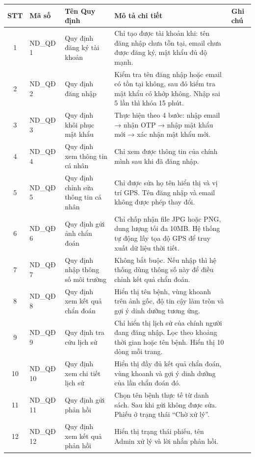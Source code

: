 \documentclass[12pt,a4paper]{article}
\begin{document}
\begin{longtable}{|c|p{1.8cm}|p{3.5cm}|p{6.5cm}|p{1cm}|}
\hline
\rowcolor{headerblue}
\textbf{STT} & \textbf{Mã số} & \textbf{Tên Quy định} & \textbf{Mô tả chi tiết} & \textbf{Ghi chú} \\
\hline
\endhead
1 & ND\_QĐ 1 & Quy định đăng ký tài khoản & Chỉ tạo được tài khoản khi: tên đăng nhập chưa tồn tại, email chưa được đăng ký, mật khẩu đủ độ mạnh. & \\
\hline
2 & ND\_QĐ 2 & Quy định đăng nhập & Kiểm tra tên đăng nhập hoặc email có tồn tại không, sau đó kiểm tra mật khẩu có khớp không. Nhập sai 5 lần thì khóa 15 phút. & \\
\hline
3 & ND\_QĐ 3 & Quy định khôi phục mật khẩu & Thực hiện theo 4 bước: nhập email → nhận OTP → nhập mật khẩu mới → xác nhận mật khẩu mới. & \\
\hline
4 & ND\_QĐ 4 & Quy định xem thông tin cá nhân & Chỉ xem được thông tin của chính mình sau khi đã đăng nhập. & \\
\hline
5 & ND\_QĐ 5 & Quy định chỉnh sửa thông tin cá nhân & Chỉ được sửa họ tên hiển thị và vị trí GPS. Tên đăng nhập và email không được phép thay đổi. & \\
\hline
6 & ND\_QĐ 6 & Quy định gửi ảnh chẩn đoán & Chỉ chấp nhận file JPG hoặc PNG, dung lượng tối đa 10MB. Hệ thống tự động lấy tọa độ GPS để truy xuất dữ liệu thời tiết. & \\
\hline
7 & ND\_QĐ 7 & Quy định nhập thông số môi trường & Không bắt buộc. Nếu nhập thì hệ thống dùng thông số này để điều chỉnh kết quả chẩn đoán. & \\
\hline
8 & ND\_QĐ 8 & Quy định xem kết quả chẩn đoán & Hiển thị tên bệnh, vùng khoanh trên ảnh gốc, độ tin cậy làm tròn và gợi ý dinh dưỡng tương ứng. & \\
\hline
9 & ND\_QĐ 9 & Quy định tra cứu lịch sử & Chỉ hiển thị lịch sử của chính người đang đăng nhập. Lọc theo khoảng thời gian hoặc tên bệnh. Hiển thị 10 dòng mỗi trang. & \\
\hline
10 & ND\_QĐ 10 & Quy định xem chi tiết lịch sử & Hiển thị đầy đủ kết quả chẩn đoán, vùng khoanh và gợi ý dinh dưỡng của lần chẩn đoán đó. & \\
\hline
11 & ND\_QĐ 11 & Quy định gửi phản hồi & Chọn tên bệnh thực tế từ danh sách. Sau khi gửi không được sửa. Phiếu ở trạng thái ``Chờ xử lý''. & \\
\hline
12 & ND\_QĐ 12 & Quy định xem kết quả phản hồi & Hiển thị trạng thái phiếu, tên Admin xử lý và lời nhắn phản hồi. & \\
\hline
\end{longtable}
\end{document}
